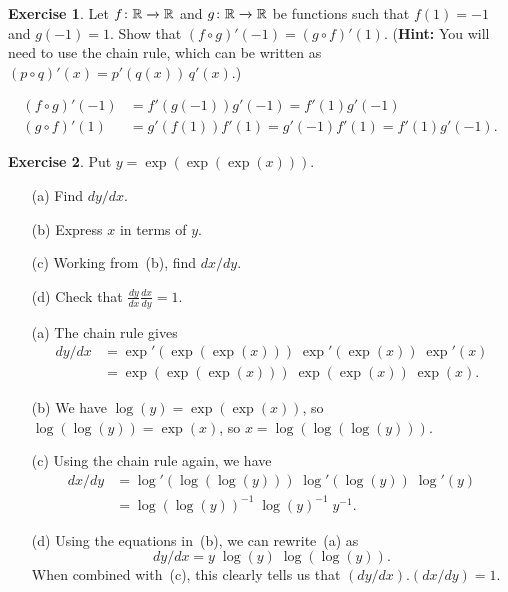 \documentclass[a4paper]{amsart}
\theoremstyle{definition}
\newtheorem{exercise}{Exercise}[section]
\newenvironment{solution}{{\noindent \bf Solution:}}{}
\begin{document}
\begin{exercise}\label{ex-exchanged-pair}
Let $f\colon{\mathbb{R}}\xrightarrow{}{\mathbb{R}}$ and $g\colon{\mathbb{R}}\xrightarrow{}{\mathbb{R}}$ be functions such that
 $f(1)=-1$ and $g(-1)=1$.  Show that
 $(f\circ g)'(-1)=(g\circ f)'(1)$.
 (\textbf{Hint:} You will need to use the chain rule, which
 can be written as $(p\circ q)'(x)=p'(q(x))\,q'(x)$.)
\end{exercise}
\begin{solution}
\begin{align*}
  (f\circ g)'(-1) &= f'(g(-1)) g'(-1) = f'(1) g'(-1) \\
  (g\circ f)'(1)  &= g'(f(1)) f'(1) = g'(-1) f'(1) = f'(1) g'(-1).
 \end{align*}
\end{solution}
\begin{exercise}\label{ex-expexpexp}
Put $y=\exp(\exp(\exp(x)))$.
 \begin{itemize}
  \item[(a)] Find $dy/dx$.
  \item[(b)] Express $x$ in terms of $y$.
  \item[(c)] Working from~(b), find $dx/dy$.
  \item[(d)] Check that $\frac{dy}{dx}\frac{dx}{dy}=1$.
 \end{itemize}
\end{exercise}
\begin{solution}
\begin{itemize}
  \item[(a)] The chain rule gives
   \begin{align*}
    dy/dx &= \exp'(\exp(\exp(x)))\;\exp'(\exp(x))\;\exp'(x) \\
          &= \exp(\exp(\exp(x)))\;\exp(\exp(x))\;\exp(x).
   \end{align*}
  \item[(b)] We have $\log(y)=\exp(\exp(x))$, so
   $\log(\log(y))=\exp(x)$, so $x=\log(\log(\log(y)))$.
  \item[(c)] Using the chain rule again, we have 
   \begin{align*}
    dx/dy &= \log'(\log(\log(y)))\;\log'(\log(y))\;\log'(y) \\
          &= \log(\log(y))^{-1}\;\log(y)^{-1}\; y^{-1}.
   \end{align*}
  \item[(d)] Using the equations in~(b), we can rewrite~(a) as 
   \[ dy/dx = y\;\log(y)\;\log(\log(y)). \]
   When combined with~(c), this clearly tells us that
   $(dy/dx).(dx/dy)=1$.  
 \end{itemize}
\end{solution}
\end{document}
